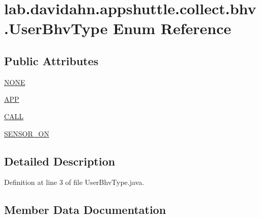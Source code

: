 \hypertarget{enumlab_1_1davidahn_1_1appshuttle_1_1collect_1_1bhv_1_1_user_bhv_type}{\section{lab.\-davidahn.\-appshuttle.\-collect.\-bhv.\-User\-Bhv\-Type \-Enum \-Reference}
\label{enumlab_1_1davidahn_1_1appshuttle_1_1collect_1_1bhv_1_1_user_bhv_type}
}
\subsection*{\-Public \-Attributes}
\begin{DoxyCompactItemize}
\item 
\hyperlink{enumlab_1_1davidahn_1_1appshuttle_1_1collect_1_1bhv_1_1_user_bhv_type_ada22cd6648d9dcb17000406a07b24966}{\-N\-O\-N\-E}
\item 
\hyperlink{enumlab_1_1davidahn_1_1appshuttle_1_1collect_1_1bhv_1_1_user_bhv_type_ad9856a183e3d3a0ebe4d5207caf45ec2}{\-A\-P\-P}
\item 
\hyperlink{enumlab_1_1davidahn_1_1appshuttle_1_1collect_1_1bhv_1_1_user_bhv_type_a594049dfada8cb51beddd75c8ea35661}{\-C\-A\-L\-L}
\item 
\hyperlink{enumlab_1_1davidahn_1_1appshuttle_1_1collect_1_1bhv_1_1_user_bhv_type_aff463a84d9c86ddd53d400c39a2839f3}{\-S\-E\-N\-S\-O\-R\-\_\-\-O\-N}
\end{DoxyCompactItemize}


\subsection{\-Detailed \-Description}


\-Definition at line 3 of file \-User\-Bhv\-Type.\-java.



\subsection{\-Member \-Data \-Documentation}
\hypertarget{enumlab_1_1davidahn_1_1appshuttle_1_1collect_1_1bhv_1_1_user_bhv_type_ad9856a183e3d3a0ebe4d5207caf45ec2}{
\subsubsection[{\-A\-P\-P}]{}}\label{enumlab_1_1davidahn_1_1appshuttle_1_1collect_1_1bhv_1_1_user_bhv_type_ad9856a183e3d3a0ebe4d5207caf45ec2}


